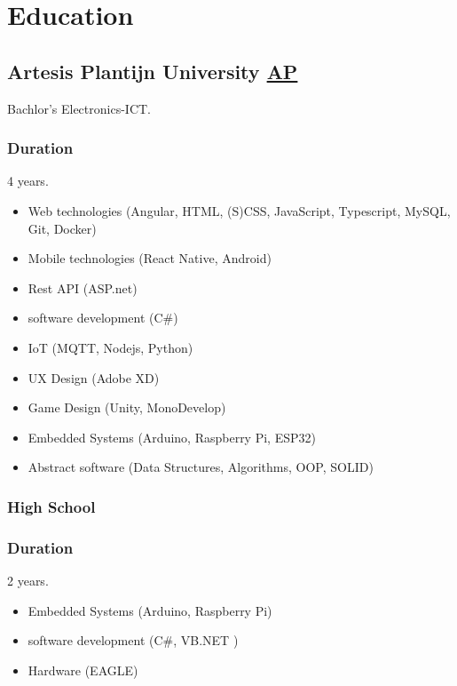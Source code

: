 \pagebreak
\section{Educat\textcolor{mycolor}{ion}}
  \subsection{Artesis Plantijn University \href{https://ap.be}{AP}}
    \hspace*{\fill}{\textcolor{mygrey}{2018-2022}}

    Bachlor's Electronics-ICT.
    \subsubsection{Duration}
      4 years.
      \begin{itemize}
        \item Web technologies (Angular, HTML, (S)CSS, JavaScript, Typescript, MySQL, Git, Docker)
        \item Mobile technologies (React Native, Android)
        \item Rest API (ASP.net)
        \item software development (C\#)
        \item IoT (MQTT, Nodejs, Python)
        \item UX Design (Adobe XD)
        \item Game Design (Unity, MonoDevelop)
        \item Embedded Systems (Arduino, Raspberry Pi, ESP32)
        \item Abstract software (Data Structures, Algorithms, OOP, SOLID)
      \end{itemize}
  \subsubsection{High School}
    \subsubsection{Duration}
      2 years.
      \begin{itemize}
        \item Embedded Systems (Arduino, Raspberry Pi)
        \item software development (C\#, VB.NET )
        \item Hardware (EAGLE)
      \end{itemize}
